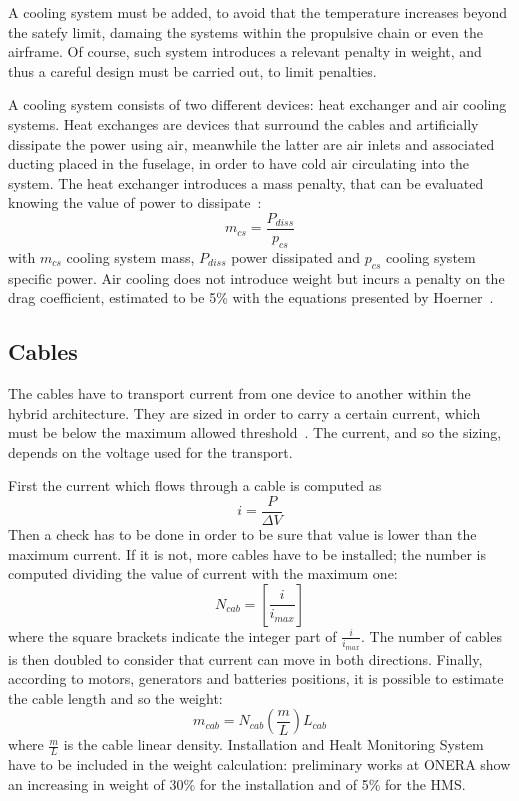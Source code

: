 A cooling system must be added, to avoid that the temperature increases beyond the satefy limit, damaing the systems within the propulsive chain or even the airframe. 
Of course, such system introduces a relevant penalty in weight, and thus a careful design must be carried out, to limit penalties. 

A cooling system consists of two different devices: heat exchanger and air cooling systems.
Heat exchanges are devices that surround the cables and artificially dissipate the power using air, meanwhile the latter are air inlets and associated ducting placed in the fuselage, in order to have cold air circulating into the system.
The heat exchanger introduces a mass penalty, that can be evaluated knowing the value of power to dissipate~\cite{bib:anton}:
\begin{equation}
m_{cs} = \frac{P_{diss}}{p_{cs}}
\label{eq:cs_mass}
\end{equation}
with $m_{cs}$ cooling system mass, $P_{diss}$ power dissipated and $p_{cs}$ cooling system specific power.
Air cooling does not introduce weight but incurs a penalty on the drag coefficient, estimated to be 5\% with the equations presented by Hoerner~\cite{bib:hoerner}.

\subsection{Cables}
\label{subsec:chap3_cable_model}

The cables have to transport current from one device to another within the hybrid architecture. 
They are sized in order to carry a certain current, which must be below the maximum allowed threshold~\cite{bib:vanbogaert}.
The current, and so the sizing, depends on the voltage used for the transport. 

First the current which flows through a cable is computed as
\begin{equation}
i = \frac{P}{\Delta V}
\end{equation}
Then a check has to be done in order to be sure that value is lower than the maximum current. 
If it is not, more cables have to be installed; the number is computed dividing the value of current with the maximum one:
\begin{equation}
N_{cab} = \left[\frac{i}{i_{max}}\right]
\end{equation} 
where the square brackets indicate the integer part of $\frac{i}{i_{max}}$. 
The number of cables is then doubled to consider that current can move in both directions. 
Finally, according to motors, generators and batteries positions, it is possible to estimate the cable length and so the weight:
\begin{equation}
m_{cab} = N_{cab}\left(\frac{m}{L}\right)L_{cab}
\end{equation}
where $\frac{m}{L}$ is the cable linear density. 
Installation and Healt Monitoring System have to be included in the weight calculation: preliminary works at ONERA show an increasing in weight of 30\% for the installation and of 5\% for the HMS.

